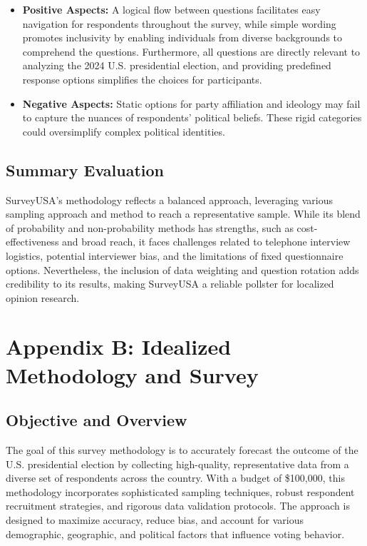 \documentclass[
  letterpaper,
  DIV=11,
  numbers=noendperiod]{scrartcl}
\providecommand{\tightlist}{%
  \setlength{\itemsep}{0pt}\setlength{\parskip}{0pt}}\usepackage{longtable,booktabs,array}
\begin{document}
\begin{itemize}
\tightlist
\item
  \textbf{Positive Aspects:} A logical flow between questions
  facilitates easy navigation for respondents throughout the survey,
  while simple wording promotes inclusivity by enabling individuals from
  diverse backgrounds to comprehend the questions. Furthermore, all
  questions are directly relevant to analyzing the 2024 U.S.
  presidential election, and providing predefined response options
  simplifies the choices for participants.\\
\item
  \textbf{Negative Aspects:} Static options for party affiliation and
  ideology may fail to capture the nuances of respondents' political
  beliefs. These rigid categories could oversimplify complex political
  identities.\\
\end{itemize}

\subsection{\texorpdfstring{Summary Evaluation\\
}{Summary Evaluation }}\label{summary-evaluation}

SurveyUSA's methodology reflects a balanced approach, leveraging various
sampling approach and method to reach a representative sample. While its
blend of probability and non-probability methods has strengths, such as
cost-effectiveness and broad reach, it faces challenges related to
telephone interview logistics, potential interviewer bias, and the
limitations of fixed questionnaire options. Nevertheless, the inclusion
of data weighting and question rotation adds credibility to its results,
making SurveyUSA a reliable pollster for localized opinion research.

\section{Appendix B: Idealized Methodology and
Survey}\label{appendix-b-idealized-methodology-and-survey}

\subsection{\texorpdfstring{\textbf{Objective and
Overview}}{Objective and Overview}}\label{objective-and-overview}

The goal of this survey methodology is to accurately forecast the
outcome of the U.S. presidential election by collecting high-quality,
representative data from a diverse set of respondents across the
country. With a budget of \$100,000, this methodology incorporates
sophisticated sampling techniques, robust respondent recruitment
strategies, and rigorous data validation protocols. The approach is
designed to maximize accuracy, reduce bias, and account for various
demographic, geographic, and political factors that influence voting
behavior.
\end{document}

